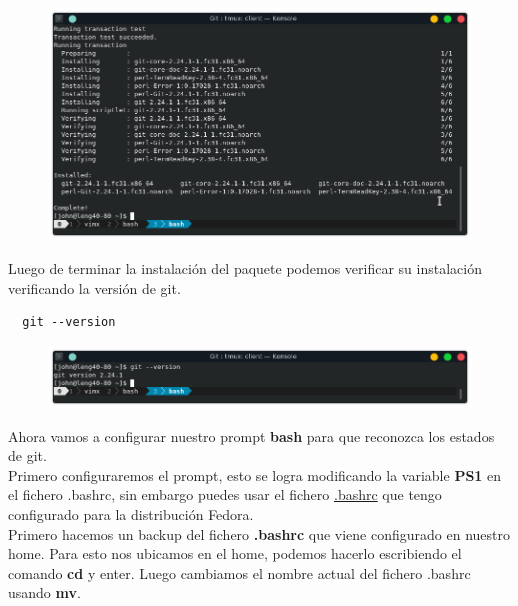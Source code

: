 \documentclass{article}
\begin{document}
\begin{figure}[h!]
  \centering
  \includegraphics[scale=0.75]{./Pictures/040_fedora_install_complete.png}
\end{figure}

\newpage

Luego de terminar la instalación del paquete podemos verificar su instalación
verificando la versión de git.

\begin{verbatim}
  git --version
\end{verbatim}

\begin{figure}[h!]
  \centering
  \includegraphics[scale=0.75]{./Pictures/041_git_installed.png}
\end{figure}

Ahora vamos a configurar nuestro prompt \textbf{bash} para que reconozca los
estados de git.\\

Primero configuraremos el prompt, esto se logra modificando la variable
\textbf{PS1} en el fichero .bashrc, sin embargo puedes usar el fichero
\href{https://raw.githubusercontent.com/xguestone/dotfiles/master/fedora/.bashrc}{.bashrc}
que tengo configurado para la distribución Fedora.\\

Primero hacemos un backup del fichero \textbf{.bashrc} que viene configurado en
nuestro home. Para esto nos ubicamos en el home, podemos hacerlo escribiendo el
comando \textbf{cd} y enter. Luego cambiamos el nombre actual del fichero
.bashrc usando \textbf{mv}.
\end{document}
